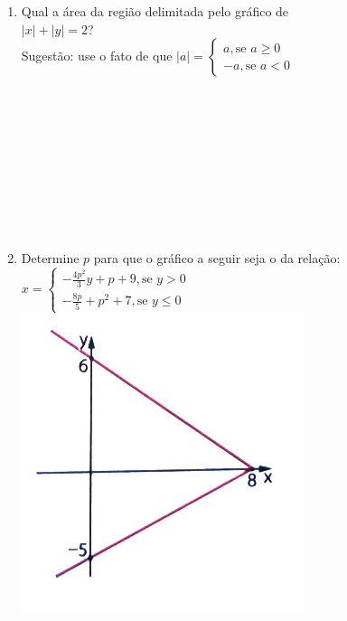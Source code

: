 \documentclass[a4paper,14pt]{article}
\begin{document}
\begin{multicols}{2}
\begin{enumerate}
\begin{enumerate}[a)]
			\end{enumerate}
		    \item Qual a área da região delimitada pelo gráfico de \\ $|x| + |y| = 2$?\\
		    Sugestão: use o fato de que $|a| = \begin{cases} 
		    	a, \text{se~} a \geq 0 \\
		    	-a, \text{se~} a < 0
		    	\end{cases}$\\\\\\\\\\\\\\\\\\\\
	    	\item Determine $p$ para que o gráfico a seguir seja o da relação:\\
	    	$x = \begin{cases}
	    		-\frac{4p^2}{3}y + p + 9, \text{se~} y > 0 \\
	    		-\frac{8p}{5} + p^2 + 7, \text{se~} y \leq 0
	    	\end{cases}$
    	    \includegraphics[width=1\linewidth]{imagens_8FMA74/imagem1}
    	    \newpage
        \end{enumerate}
    \end{multicols}
\end{document}
